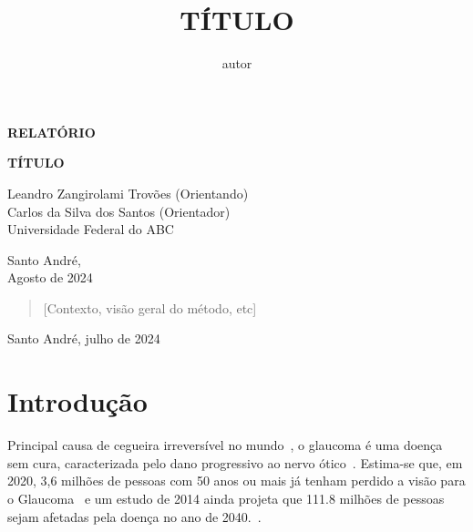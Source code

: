 \documentclass[12pt]{article}
\title{TÍTULO}
\author{autor}
\begin{document}
\thispagestyle{empty}

    
    \begin{flushright}
        \begin{huge}
            \textbf{RELATÓRIO}\\[3,5cm]
        \end{huge}
{\bf \LARGE  TÍTULO}

\bigskip
        
        Leandro Zangirolami Trovões (Orientando)\\
        Carlos da Silva dos Santos (Orientador)\\
        Universidade Federal do ABC\\[5,5cm]
    \end{flushright}

    \vfill
    
    \begin{center}
        Santo André,\\
        Agosto de 2024
    \end{center}
    
    \newpage
\bigskip

\begin{center}
\end{center}

\begin{quote}
[Contexto, visão geral do método, etc]
\end{quote}

\begin{center}
Santo André, julho de 2024
\end{center}

\newpage
\bigskip

\section{Introdução}
\label{sec:introducao}

Principal causa de cegueira irreversível no mundo~\cite{steinmetz_causes_2021}, o glaucoma é uma doença sem cura, caracterizada pelo dano progressivo ao nervo ótico~\cite{who_2019}. Estima-se que, em 2020, 3,6 milhões de pessoas com 50 anos ou mais já tenham perdido a visão para o Glaucoma~\cite{steinmetz_causes_2021} e um estudo de 2014 ainda projeta que 111.8 milhões de pessoas sejam afetadas pela doença no ano de 2040.~\cite{tham_global_2014}.
\end{document}
